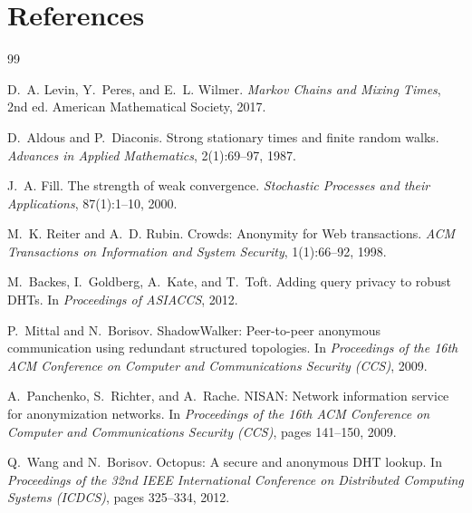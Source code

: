 \documentclass[11pt]{article}
\begin{document}
\section*{References}
\begin{thebibliography}{99}\small

D.~A. Levin, Y.~Peres, and E.~L. Wilmer.
\newblock \emph{Markov Chains and Mixing Times}, 2nd ed.
\newblock American Mathematical Society, 2017.

D.~Aldous and P.~Diaconis.
\newblock Strong stationary times and finite random walks.
\newblock \emph{Advances in Applied Mathematics}, 2(1):69--97, 1987.

J.~A. Fill.
\newblock The strength of weak convergence.
\newblock \emph{Stochastic Processes and their Applications}, 87(1):1--10, 2000.

M.~K. Reiter and A.~D. Rubin.
\newblock Crowds: Anonymity for {W}eb transactions.
\newblock \emph{ACM Transactions on Information and System Security}, 1(1):66--92, 1998.

M.~Backes, I.~Goldberg, A.~Kate, and T.~Toft.
\newblock Adding query privacy to robust {DHT}s.
\newblock In \emph{Proceedings of ASIACCS}, 2012.



P.~Mittal and N.~Borisov.
\newblock ShadowWalker: Peer-to-peer anonymous communication using redundant structured topologies.
\newblock In \emph{Proceedings of the 16th ACM Conference on Computer and Communications Security (CCS)}, 2009.

A.~Panchenko, S.~Richter, and A.~Rache.
\newblock NISAN: Network information service for anonymization networks.
\newblock In \emph{Proceedings of the 16th ACM Conference on Computer and Communications Security (CCS)}, pages 141--150, 2009.

Q.~Wang and N.~Borisov.
\newblock Octopus: A secure and anonymous DHT lookup.
\newblock In \emph{Proceedings of the 32nd IEEE International Conference on Distributed Computing Systems (ICDCS)}, pages 325--334, 2012.
\end{thebibliography}
\end{document}
